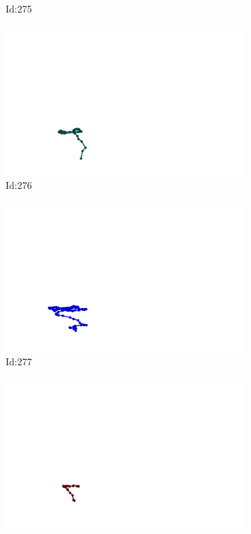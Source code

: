 \documentclass[12pt,twoside]{report}
\begin{document}
\begin{figure}
\begin{subfigure}[b]{0.20\textwidth}
\caption{Id:275}
\end{subfigure}
\begin{subfigure}[b]{0.20\textwidth}
\centering
\includegraphics[width=\textwidth]{../../trajectories/276.png}
\caption{Id:276}
\end{subfigure}
\begin{subfigure}[b]{0.20\textwidth}
\centering
\includegraphics[width=\textwidth]{../../trajectories/277.png}
\caption{Id:277}
\end{subfigure}
\begin{subfigure}[b]{0.20\textwidth}
\centering
\includegraphics[width=\textwidth]{../../trajectories/278.png}

\end{subfigure}
\end{figure}
\end{document}
